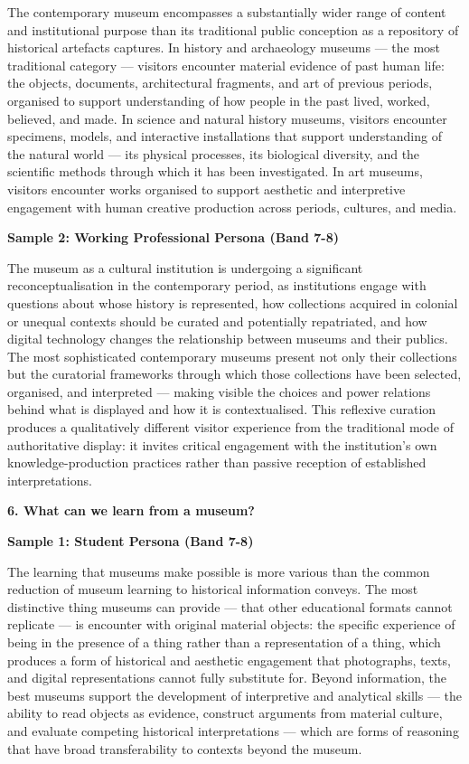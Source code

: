 The contemporary museum encompasses a substantially wider range of content and institutional purpose than its traditional public conception as a repository of historical artefacts captures. In history and archaeology museums — the most traditional category — visitors encounter material evidence of past human life: the objects, documents, architectural fragments, and art of previous periods, organised to support understanding of how people in the past lived, worked, believed, and made. In science and natural history museums, visitors encounter specimens, models, and interactive installations that support understanding of the natural world — its physical processes, its biological diversity, and the scientific methods through which it has been investigated. In art museums, visitors encounter works organised to support aesthetic and interpretive engagement with human creative production across periods, cultures, and media.

\textbf{Sample 2: Working Professional Persona (Band 7-8)}

The museum as a cultural institution is undergoing a significant reconceptualisation in the contemporary period, as institutions engage with questions about whose history is represented, how collections acquired in colonial or unequal contexts should be curated and potentially repatriated, and how digital technology changes the relationship between museums and their publics. The most sophisticated contemporary museums present not only their collections but the curatorial frameworks through which those collections have been selected, organised, and interpreted — making visible the choices and power relations behind what is displayed and how it is contextualised. This reflexive curation produces a qualitatively different visitor experience from the traditional mode of authoritative display: it invites critical engagement with the institution's own knowledge-production practices rather than passive reception of established interpretations.

\separator

\begin{ieltsquestion}
\textbf{6. What can we learn from a museum?}
\end{ieltsquestion}
\textbf{Sample 1: Student Persona (Band 7-8)}

The learning that museums make possible is more various than the common reduction of museum learning to historical information conveys. The most distinctive thing museums can provide — that other educational formats cannot replicate — is encounter with original material objects: the specific experience of being in the presence of a thing rather than a representation of a thing, which produces a form of historical and aesthetic engagement that photographs, texts, and digital representations cannot fully substitute for. Beyond information, the best museums support the development of interpretive and analytical skills — the ability to read objects as evidence, construct arguments from material culture, and evaluate competing historical interpretations — which are forms of reasoning that have broad transferability to contexts beyond the museum.

